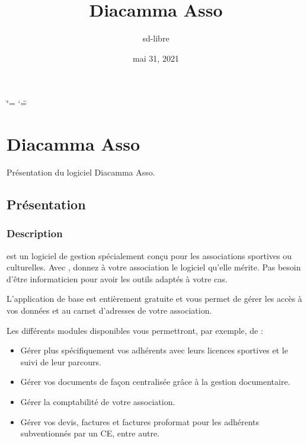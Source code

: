 \documentclass[a4paper,10pt,oneside,french]{sphinxmanual}
\title{Diacamma Asso}
\date{mai 31, 2021}
\author{sd-libre}
\begin{document}
\ifdefined\shorthandoff
  \ifnum\catcode`\=\string=\active\shorthandoff{=}\fi
  \ifnum\catcode`\"=\active{}\fi
\fi

\pagestyle{empty}
\sphinxmaketitle
\pagestyle{plain}
\sphinxtableofcontents
\pagestyle{normal}
\label{\detokenize{index::doc}}



\chapter{Diacamma Asso}
\label{\detokenize{asso/index:diacamma-asso}}\label{\detokenize{asso/index::doc}}
\sphinxAtStartPar
Présentation du logiciel Diacamma Asso.


\section{Présentation}
\label{\detokenize{asso/presentation:presentation}}\label{\detokenize{asso/presentation::doc}}

\subsection{Description}
\label{\detokenize{asso/presentation:description}}
\sphinxAtStartPar
{} est un logiciel de gestion spécialement conçu pour les associations sportives ou culturelles.
Avec , donnez à votre association le logiciel qu’elle mérite. Pas besoin d’être informaticien pour avoir les outils adaptés à votre cas.

\sphinxAtStartPar
L’application de base est entièrement gratuite et vous permet de gérer les accès à vos données et au carnet d’adresses de votre association.

\sphinxAtStartPar
Les différents modules disponibles vous permettront, par exemple, de :
\begin{itemize}
\item {} 
\sphinxAtStartPar
Gérer plus spécifiquement vos adhérents avec leurs licences sportives et le suivi de leur parcours.

\item {} 
\sphinxAtStartPar
Gérer vos documents de façon centralisée grâce à la gestion documentaire.

\item {} 
\sphinxAtStartPar
Gérer la comptabilité de votre association.

\item {} 
\sphinxAtStartPar
Gérer vos devis, factures et factures proformat pour les adhérents subventionnés par un CE, entre autre.

\end{itemize}
\end{document}
